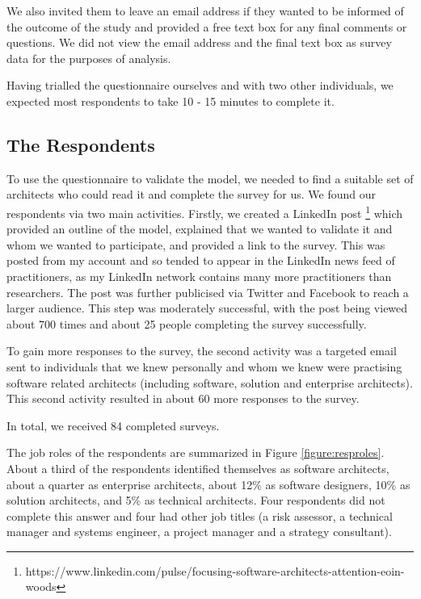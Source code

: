 We also invited them to leave an email address if they wanted to be informed of the outcome of the study and provided a free text box for any final comments or questions.  We did not view the email address and the final text box as survey data for the purposes of analysis.

Having trialled the questionnaire ourselves and with two other individuals, we expected most respondents to take 10 - 15 minutes to complete it.

\subsection{The Respondents}

To use the questionnaire to validate the model, we needed to find a suitable set of architects who could read it and complete the survey for us.  We found our respondents via two main activities.  
Firstly, we created a LinkedIn post \footnote{https://www.linkedin.com/pulse/focusing-software-architects-attention-eoin-woods} which provided an outline of the model, explained that we wanted to validate it and whom we wanted to participate, and provided a link to the survey.  This was posted from my account and so tended to appear in the LinkedIn news feed of practitioners, as my LinkedIn network contains many more practitioners than researchers.  The post was further publicised via Twitter and Facebook to reach a larger audience.  This step was moderately successful, with the post being viewed about 700 times and about 25 people completing the survey successfully.

To gain more responses to the survey, the second activity was a targeted email sent to individuals that we knew personally and whom we knew were practising software related architects (including software, solution and enterprise architects).  This second activity resulted in about 60 more responses to the survey.

In total, we received 84 completed surveys.

The job roles of the respondents are summarized in Figure \ref{figure:resproles}.  About a third of the respondents identified themselves as software architects, about a quarter as enterprise architects, about 12\% as software designers, 10\% as solution architects, and 5\% as technical architects.  Four respondents did not complete this answer and four had other job titles (a risk assessor, a technical manager and systems engineer, a project manager and a strategy consultant).

